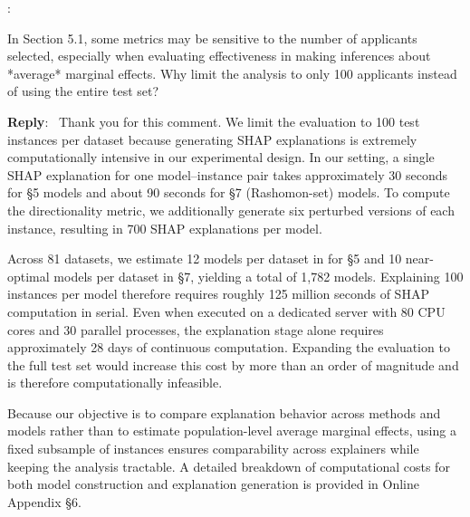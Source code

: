 \documentclass[11pt]{article}
\newcounter{se}[section]
\newcounter{reviewer}
\newcounter{point}[reviewer]
\renewcommand{\thepoint}{R\,\thereviewer.\arabic{point}}
\newenvironment{point}{
    \refstepcounter{point} \bigskip \noindent {\textbf{\thepoint}}: \rmfamily \itshape
}{\medskip}
\newenvironment{reply}
 {\par\medskip \noindent \begin{sf}\textbf{Reply}:\ }
 {\medskip \end{sf}}
\begin{document}
\begin{point}
In Section 5.1, some metrics may be sensitive to the number of applicants selected, especially when evaluating effectiveness in making inferences about *average* marginal effects. Why limit the analysis to only 100 applicants instead of using the entire test set?
\end{point}

\begin{reply}
Thank you for this comment. We limit the evaluation to 100 test instances per dataset because generating SHAP explanations is extremely computationally intensive in our experimental design. In our setting, a single SHAP explanation for one model–instance pair takes approximately 30 seconds for \S 5 models and about 90 seconds for \S 7 (Rashomon-set) models. To compute the directionality metric, we additionally generate six perturbed versions of each instance, resulting in 700 SHAP explanations per model.

Across 81 datasets, we estimate 12 models per dataset in for \S 5 and 10 near-optimal models per dataset in \S 7, yielding a total of 1,782 models. Explaining 100 instances per model therefore requires roughly 125 million seconds of SHAP computation in serial. Even when executed on a dedicated server with 80 CPU cores and 30 parallel processes, the explanation stage alone requires approximately 28 days of continuous computation. Expanding the evaluation to the full test set would increase this cost by more than an order of magnitude and is therefore computationally infeasible.

Because our objective is to compare explanation behavior across methods and models rather than to estimate population-level average marginal effects, using a fixed subsample of instances ensures comparability across explainers while keeping the analysis tractable. A detailed breakdown of computational costs for both model construction and explanation generation is provided in Online Appendix \S 6.


\end{reply}
\end{document}
